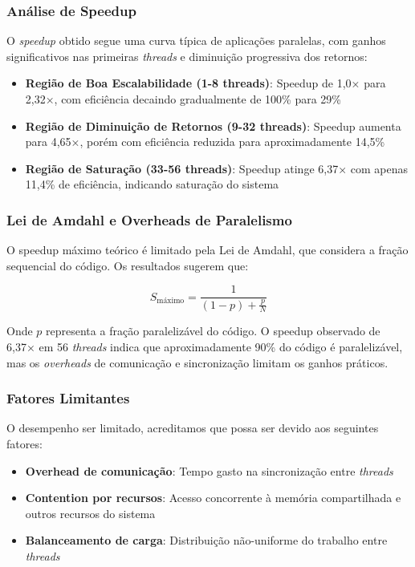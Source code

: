 \documentclass[a4paper,12pt]{article}
\begin{document}
\subsubsection*{Análise de Speedup}
O \textit{speedup} obtido segue uma curva típica de aplicações paralelas, com ganhos significativos nas primeiras \textit{threads} e diminuição progressiva dos retornos:

\begin{itemize}
	\item \textbf{Região de Boa Escalabilidade (1-8 threads)}: Speedup de 1,0× para 2,32×, com eficiência decaindo gradualmente de 100\% para 29\%
	\item \textbf{Região de Diminuição de Retornos (9-32 threads)}: Speedup aumenta para 4,65×, porém com eficiência reduzida para aproximadamente 14,5\%
	\item \textbf{Região de Saturação (33-56 threads)}: Speedup atinge 6,37× com apenas 11,4\% de eficiência, indicando saturação do sistema
\end{itemize}

\subsubsection*{Lei de Amdahl e Overheads de Paralelismo}
O speedup máximo teórico é limitado pela Lei de Amdahl, que considera a fração sequencial do código. Os resultados sugerem que:

\begin{equation}
	S_{\text{máximo}} = \frac{1}{(1 - p) + \frac{p}{N}}
\end{equation}

Onde $p$ representa a fração paralelizável do código. O speedup observado de 6,37× em 56 \textit{threads} indica que aproximadamente 90\% do código é paralelizável, mas os \textit{overheads} de comunicação e sincronização limitam os ganhos práticos.

\subsubsection*{Fatores Limitantes}
O desempenho ser limitado, acreditamos que possa ser devido aos seguintes fatores:

\begin{itemize}
	\item \textbf{Overhead de comunicação}: Tempo gasto na sincronização entre \textit{threads}
	\item \textbf{Contention por recursos}: Acesso concorrente à memória compartilhada e outros recursos do sistema
	\item \textbf{Balanceamento de carga}: Distribuição não-uniforme do trabalho entre \textit{threads}
\end{itemize}
\end{document}
